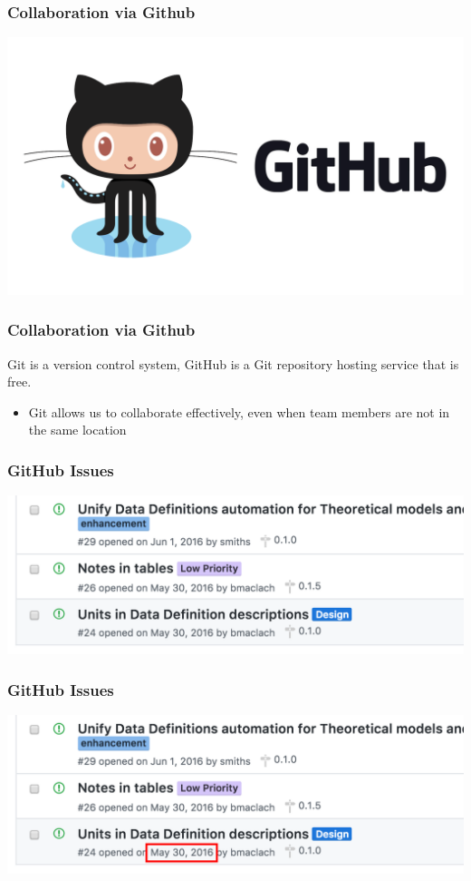 \documentclass{beamer}
\begin{document}
\begin{frame}
\frametitle{Collaboration via Github}
\centering
\includegraphics[scale=0.2]{./Github_Logo.png}
\end{frame}

\begin{frame}
\frametitle{Collaboration via Github}
Git is a version control system, GitHub is a Git repository hosting service that is \alert{free}.
\begin{itemize}
 \item<1-> Git allows us to collaborate effectively, even when team members are not in the same location
\end{itemize}
\end{frame}

\begin{frame}
\frametitle{GitHub Issues}
\begin{center}
 \includegraphics[scale=0.6]{Old_Issue.png}
\end{center}
\end{frame}

\begin{frame}
\frametitle{GitHub Issues}
\begin{center}
 \includegraphics[scale=0.6]{Old_Issue_With_Box.png}
\end{center}
\end{frame}
\end{document}

